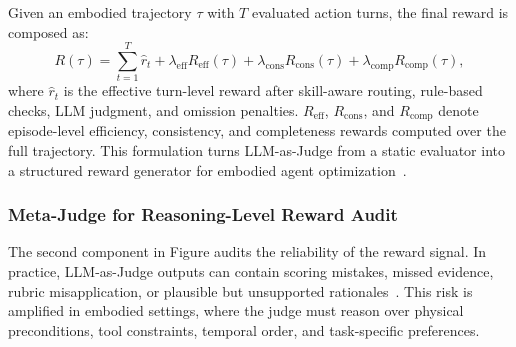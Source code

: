 Given an embodied trajectory $\tau$ with $T$ evaluated action turns, the final reward is composed as:
\begin{equation}
R(\tau)=
\sum_{t=1}^{T}\hat{r}_{t}
+ \lambda_{\mathrm{eff}} R_{\mathrm{eff}}(\tau)
+ \lambda_{\mathrm{cons}} R_{\mathrm{cons}}(\tau)
+ \lambda_{\mathrm{comp}} R_{\mathrm{comp}}(\tau),
\label{eq:multi_tier_reward}
\end{equation}
where $\hat{r}_{t}$ is the effective turn-level reward after skill-aware routing, rule-based checks, LLM judgment, and omission penalties. $R_{\mathrm{eff}}$, $R_{\mathrm{cons}}$, and $R_{\mathrm{comp}}$ denote episode-level efficiency, consistency, and completeness rewards computed over the full trajectory. This formulation turns LLM-as-Judge from a static evaluator into a structured reward generator for embodied agent optimization~\citep{zheng2023judging}.

\subsubsection{Meta-Judge for Reasoning-Level Reward Audit}
\label{subsec:meta_judge_audit}

The second component in Figure audits the reliability of the reward signal. In practice, LLM-as-Judge outputs can contain scoring mistakes, missed evidence, rubric misapplication, or plausible but unsupported rationales~\citep{silva2026metajudging}. This risk is amplified in embodied settings, where the judge must reason over physical preconditions, tool constraints, temporal order, and task-specific preferences.


